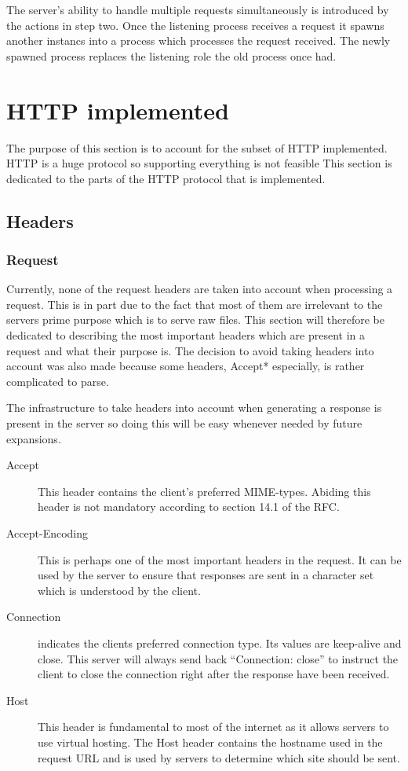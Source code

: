 \documentclass{sig-alternate}
\begin{document}
The server's ability to handle multiple requests simultaneously is
introduced by the actions in step two. Once the listening process
receives a request it spawns another instancs into a process which
processes the request received. The newly spawned process replaces the
listening role the old process once had.

\section{HTTP implemented}

The purpose of this section is to account for the subset of HTTP
implemented. HTTP is a huge protocol so supporting everything is not
feasible This section is dedicated to the parts of the HTTP protocol
that is implemented.


\subsection{Headers}
\subsubsection{Request}
Currently, none of the request headers are taken into account when
processing a request. This is in part due to the fact that most of
them are irrelevant to the servers prime purpose which is to serve raw
files. This section will therefore be dedicated to describing the most
important headers which are present in a request and what their
purpose is. The decision to avoid taking headers into account was also
made because some headers, Accept* especially, is rather complicated
to parse.

The infrastructure to take headers into account when generating a
response is present in the server so doing this will be easy whenever
needed by future expansions.

\begin{description}
\item[Accept] This header contains the client's preferred
  MIME-types. Abiding this header is not mandatory according to
  section 14.1 of the RFC.
\item[Accept-Encoding] This is perhaps one of the most important
  headers in the request. It can be used by the server to ensure that
  responses are sent in a character set which is understood by the
  client.
\item[Connection] indicates the clients preferred connection type. Its
  values are keep-alive and close. This server will always send back
  ``Connection: close'' to instruct the client to close the connection
  right after the response have been received.
\item[Host] This header is fundamental to most of the internet as it
  allows servers to use virtual hosting. The Host header contains the
  hostname used in the request URL and is used by servers to determine
  which site should be sent.

\end{description}
\end{document}
